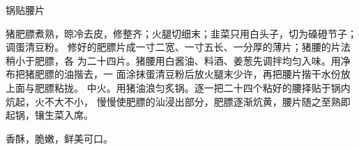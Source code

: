 \begin{recipe}{锅贴腰片}

\ingredients


\cooking

\step 猪肥膘煮熟，晾冷去皮，修整齐；火腿切细末；韭菜只用白头子，切为磉磴节子；
调蛋清豆粉。
\step 修好的肥膘片成一寸二宽、一寸五长、一分厚的薄片；猪腰的片法稍小于肥膘，各
为二十四片。猪腰用白酱油、料酒、姜葱先调拌均匀入味。用净布把猪肥膘的油揩去，一
面涂抹蛋清豆粉后放火腿末少许，再把腰片揩干水份放上面与肥膘粘拢。
\step 中火。用猪油浪匀炙锅。逐一把二十四个粘好的腰择贴于锅内炕起，火不大不小，
慢慢使肥膘的汕浸出部分，肥膘逐渐炕黄，腰片随之至熟即起锅，镶生菜入席。

\notes

香酥，脆嫩，鲜美可口。

\end{recipe}

